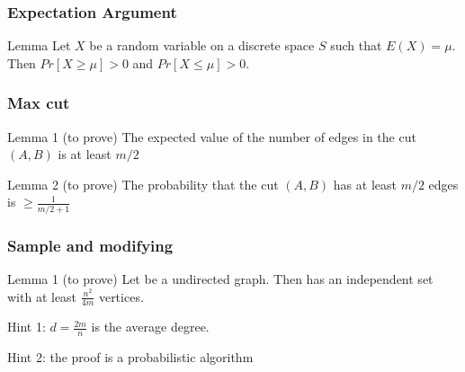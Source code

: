 




\begin{frame}[fragile]
\frametitle{Expectation Argument}
\begin{block}{Lemma}
Let \(X\) be a random variable on a discrete space \(S\) such that \(E(X)=\mu\).
Then \(Pr[X\ge \mu] > 0\) and \(Pr[X\le \mu] > 0\).
      \end{block}
\end{frame}



\begin{frame}[fragile]
  \frametitle{Max cut}
\begin{algorithm}[H]
\end{algorithm}

\begin{block}{Lemma 1 (to prove)}
The expected value of the number of edges in the cut \((A,B)\) is at least \(m/2\)
\end{block}
\begin{block}{Lemma 2 (to prove)}
The probability that the cut \((A,B)\) has at least \(m/2\) edges
is  \(\ge \frac{1}{m/2 + 1}\)
\end{block}
\end{frame}

\begin{frame}[fragile]
  \frametitle{Sample and modifying}
\begin{block}{Lemma 1 (to prove)}
Let \g be a undirected graph.
Then \g has an independent set with at least \(\frac{n^{2}}{4m}\) vertices.
\end{block}

Hint 1: \(d = \frac{2m}{n}\) is the average degree.

Hint 2: the proof is a probabilistic algorithm
\end{frame}




